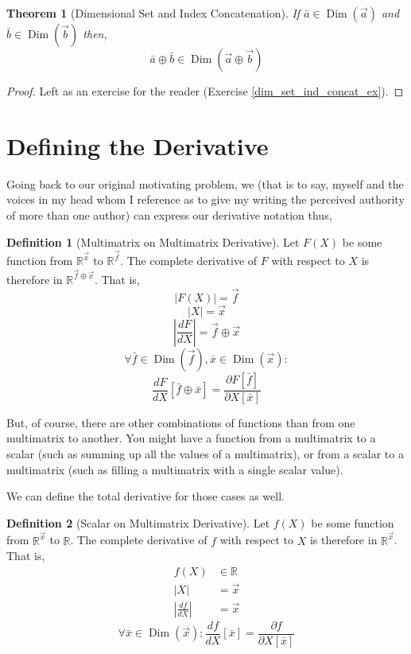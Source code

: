 \documentclass[12pt]{book}
\theoremstyle{plain}
\newtheorem{theorem}{Theorem}[chapter]
\theoremstyle{definition}
\newtheorem{definition}{Definition}[chapter]
\theoremstyle{ppart}
\theoremstyle{case}
\theoremstyle{solution}
\DeclareMathOperator{\Dim}{Dim}
\newcommand{\shape}[1]{\left|#1\right|}
\begin{document}
\begin{theorem}[Dimensional Set and Index Concatenation]
\label{dim_set_ind_concat_thm}
If $\bar{a} \in \Dim(\vec{a})$ and $\bar{b} \in \Dim(\vec{b})$ then,
\[ \bar{a} \oplus \bar{b} \in \Dim(\vec{a} \oplus \vec{b}) \]
\end{theorem}
\begin{proof}
Left as an exercise for the reader (Exercise \ref{dim_set_ind_concat_ex}).
\end{proof}

\section{Defining the Derivative}

Going back to our original motivating problem, we (that is to say, myself and the voices
in my head whom I reference as to give my writing the perceived authority
of more than one author) can express our derivative notation thus,

\begin{definition}[Multimatrix on Multimatrix Derivative]
\label{mm_derivative}
Let $F(X)$ be some function from $\mathbb{R}^{\vec{x}}$ to $\mathbb{R}^{\vec{f}}$.
The complete derivative of $F$ with respect to $X$ is therefore in
$\mathbb{R}^{\vec{f} \oplus \vec{x}}$. That is,
\[ \shape{F(X)} = \vec{f} \]
\[ \shape{X} = \vec{x} \]
\[ \shape{\frac{dF}{dX}} = \vec{f} \oplus \vec{x} \]
\[
\forall \bar{f} \in \Dim(\vec{f}),
        \bar{x} \in \Dim(\vec{x}):
\]
\[
\frac{dF}{dX}[\bar{f} \oplus \bar{x}] =
\frac{\partial F[\bar{f}]}{\partial X[\bar{x}]}
\]
\end{definition}

But, of course, there are other combinations of functions than from one
multimatrix to another. You might have a function from a multimatrix to a
scalar (such as summing up all the values of a multimatrix), or from a scalar
to a multimatrix (such as filling a multimatrix with a single scalar value).

We can define the total derivative for those cases as well.

\begin{definition}[Scalar on Multimatrix Derivative]
\label{sm_derivative}
Let $f(X)$ be some function from $\mathbb{R}^{\vec{x}}$ to $\mathbb{R}$.
The complete derivative of $f$ with respect to $X$ is therefore in
$\mathbb{R}^{\vec{x}}$. That is,
\begin{align*}
f(X) &\in \mathbb{R} \\
\shape{X} &= \vec{x} \\
\shape{\frac{df}{dX}} &= \vec{x}
\end{align*}
\[
\forall \bar{x} \in \Dim(\vec{x}):
        \frac{df}{dX}[\bar{x}] =
        \frac{\partial f}{\partial X[\bar{x}]}
\]
\end{definition}
\end{document}
